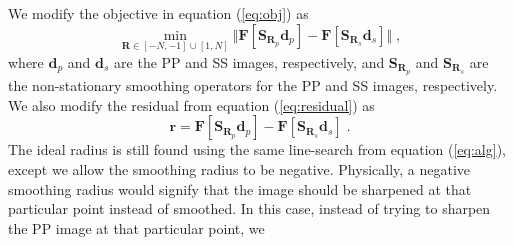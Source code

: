         We modify the objective in equation (\ref{eq:obj}) as
            \begin{equation}
                \label{eq:obj2}
                \min_{\mathbf{R} \in [-N, -1] \cup [1, N]} \Big \Vert \mathbf{F}[
                \mathbf{S}_{\mathbf{R}_p} \mathbf{d}_{p} ] - \mathbf{F}[
                \mathbf{S}_{\mathbf{R}_s}\mathbf{d}_{s}] \Big \Vert\;, 
            \end{equation}
        where $\mathbf{d}_p$ and $\mathbf{d}_s$ are the PP and SS images, respectively, and
        $\mathbf{S}_{\mathbf{R}_p}$ and $\mathbf{S}_{\mathbf{R}_s}$ are the non-stationary smoothing
        operators for the PP and SS images, respectively.
        We also modify the residual from equation (\ref{eq:residual}) as
            \begin{equation}
                \label{eq:residual2}
                \mathbf{r} = \mathbf{F}[\mathbf{S}_{\mathbf{R}_{p}}\mathbf{d}_p] -
                \textbf{F}[\mathbf{S}_{\mathbf{R}_s}\mathbf{d}_s]\;.
            \end{equation}
        The ideal radius is still found using the same line-search from equation (\ref{eq:alg}),
        except we allow the smoothing radius to be negative. Physically, a negative smoothing radius
        would signify that the image should be sharpened at that particular point instead of
        smoothed. In this case, instead of trying to sharpen the PP image at that particular point, 
        we

